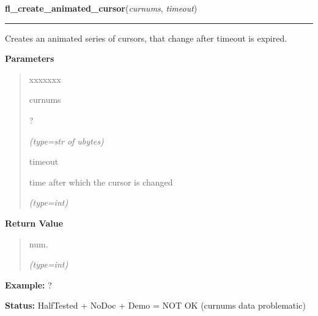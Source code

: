     \label{xformslib:flcursor:fl_create_animated_cursor}

    \vspace{0.5ex}

\hspace{.8\funcindent}\begin{boxedminipage}{\funcwidth}

    \raggedright \textbf{fl\_create\_animated\_cursor}(\textit{curnums}, \textit{timeout})

    \vspace{-1.5ex}

    \rule{\textwidth}{0.5\fboxrule}
\setlength{\parskip}{2ex}
    Creates an animated series of cursors, that change after timeout is 
    expired.

\setlength{\parskip}{1ex}
      \textbf{Parameters}
      \vspace{-1ex}

      \begin{quote}
        \begin{Ventry}{xxxxxxx}

          \item[curnums]

          ?

            {\it (type=str of ubytes)}

          \item[timeout]

          time after which the cursor is changed

            {\it (type=int)}

        \end{Ventry}

      \end{quote}

      \textbf{Return Value}
    \vspace{-1ex}

      \begin{quote}
      num.

      {\it (type=int)}

      \end{quote}

\textbf{Example:} ?



\textbf{Status:} HalfTested + NoDoc + Demo = NOT OK (curnums data problematic)



    \end{boxedminipage}

